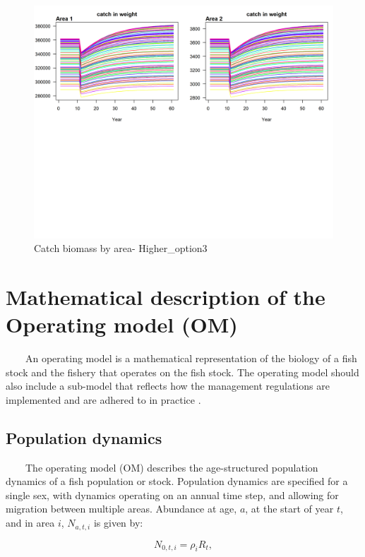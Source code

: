 \documentclass[
]{book}
\begin{document}
\begin{figure}
\includegraphics[width=1\linewidth]{data-test/Kole/Higher_option3_catchB_Area} \caption{Catch biomass by area- Higher_option3 }\label{fig:fig-catch-H-opt3}
\end{figure}

\chapter{Mathematical description of the Operating model (OM)}\label{OM}

~~~~An operating model is a mathematical representation of the biology of a fish stock and the fishery that operates on the fish stock. The operating model should also include a sub-model that reflects how the management regulations are implemented and are adhered to in practice \citep{punt_management_2016}.

\section{Population dynamics}\label{population-dynamics}

~~~~The operating model (OM) describes the age-structured population dynamics of a fish population or stock. Population dynamics are specified for a single sex, with dynamics operating on an annual time step, and allowing for migration between multiple areas. Abundance at age, \(a\), at the start of year \(t\), and in area \(i\), \(N_{a,t,i}\) is given by:

\[
N_{0,t,i} = \rho_i R_t, \tag{eq. 1} \label{eq:first}
\]
\end{document}
